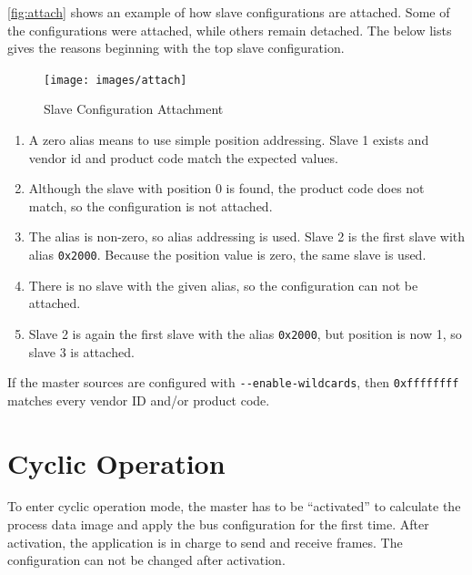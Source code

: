 \documentclass[a4paper,12pt,BCOR6mm,bibtotoc,idxtotoc]{scrbook}
\begin{document}
\autoref{fig:attach} shows an example of how slave configurations are
attached. Some of the configurations were attached, while others remain
detached. The below lists gives the reasons beginning with the top slave
configuration.

\begin{figure}[htbp]
  \centering
  \texttt{[image: images/attach]}
  \caption{Slave Configuration Attachment}
  \label{fig:attach}
\end{figure}

\begin{enumerate}

\item A zero alias means to use simple position addressing. Slave 1 exists and
vendor id and product code match the expected values.

\item Although the slave with position 0 is found, the product code does not
match, so the configuration is not attached.

\item The alias is non-zero, so alias addressing is used. Slave 2 is the first
slave with alias \lstinline+0x2000+. Because the position value is zero, the
same slave is used.

\item There is no slave with the given alias, so the configuration can not be
attached.

\item Slave 2 is again the first slave with the alias \lstinline+0x2000+, but
position is now 1, so slave 3 is attached.

\end{enumerate}

If the master sources are configured with \lstinline+--enable-wildcards+, then
\lstinline+0xffffffff+ matches every vendor ID and/or product code.


\section{Cyclic Operation}
\label{sec:cyclic}


To enter cyclic operation mode, the master has to be ``activated'' to
calculate the process data image and apply the bus configuration for the first
time. After activation, the application is in charge to send and receive
frames. The configuration can not be changed after activation.
\end{document}
